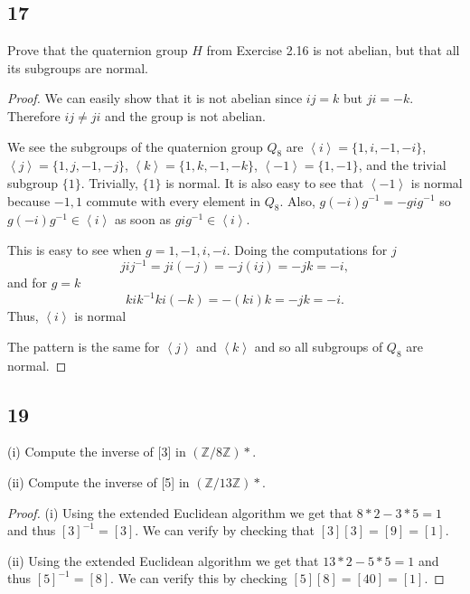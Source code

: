 \documentclass{article}
\newcommand{\Z}{\mathbb{Z}}
\newcommand{\gen}[1]{\left\langle #1 \right\rangle}
\newenvironment{hwproof}[1]
{
    #1
    \begin{proof}
}{
    \end{proof}
}
\begin{document}
\subsection*{17}
\begin{hwproof}
    {
        Prove that the quaternion group $H$ from Exercise 2.16 is not abelian, but
        that all its subgroups are normal.
    }

    We can easily show that it is not abelian since $ij = k$ but $ji = -k$.
    Therefore $ij \neq ji$ and the group is not abelian.

    We see the subgroups of the quaternion group $Q_8$ are
    $\gen{i} = \{1,i,-1,-i\}$, $\gen{j}=\{1,j,-1,-j\}$, $\gen{k} = \{1,k,-1,-k\}$,
    $\gen{-1} = \{1,-1\}$, and the trivial subgroup $\{1\}$. Trivially,
    $\{1\}$ is normal. It is also easy to see that $\gen{-1}$ is normal
    because $-1, 1$ commute with every element in $Q_8$. Also,
    $g(-i)g^{-1} = -gig^{-1}$ so $g(-i)g^{-1} \in \gen{i}$ as soon as
    $gig^{-1} \in \gen{i}$.

    This is easy to see when $g = 1,-1,i,-i$. Doing the computations for $j$
    \begin{equation*}
        jij^{-1} = ji(-j) = -j(ij) = -jk = -i,
    \end{equation*}
    and for $g = k$
    \begin{equation*}
        kik^{-1} ki(-k) = -(ki)k = -jk = -i.
    \end{equation*}
    Thus, $\gen{i}$ is normal

    The pattern is the same for $\gen{j}$ and $\gen{k}$ and so all subgroups
    of $Q_8$ are normal.
\end{hwproof}

\subsection*{19}
\begin{hwproof}
    {
        (i) Compute the inverse of [3] in $(\Z / 8\Z)*$.

        (ii) Compute the inverse of [5] in $(\Z / 13\Z)*$.
    }

    (i) Using the extended Euclidean algorithm we get that
    $8*2 - 3*5 = 1$ and thus $[3]^{-1} = [3]$. We can verify by checking
    that $[3][3] = [9] = [1]$.

    (ii) Using the extended Euclidean algorithm we get that
    $13 * 2 - 5 * 5 = 1$ and thus $[5]^{-1} = [8]$. We can verify this by checking
    $[5][8] = [40] = [1]$.
\end{hwproof}
\end{document}
